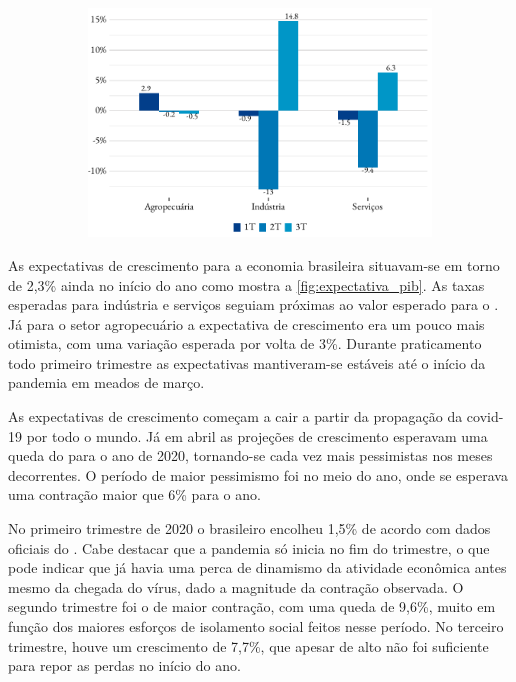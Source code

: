 \begin{figure}[!h]
\begin{subfigure}{\linewidth}
		\includegraphics{fig/pib_oferta.pdf}
		\notes{\trimestres[1-3]}
	\end{subfigure}
\end{figure}
\par As expectativas de crescimento para a economia brasileira situavam-se em torno de 2,3\% ainda no início do ano como mostra a \ref{fig:expectativa_pib}. As taxas esperadas para indústria e serviços seguiam próximas ao valor esperado para o . Já para o setor agropecuário a expectativa de crescimento era um pouco mais otimista, com uma variação esperada por volta de 3\%. Durante praticamento todo primeiro trimestre as expectativas mantiveram-se estáveis até o início da pandemia em meados de março.
\par As expectativas de crescimento começam a cair a partir da propagação da covid-19 por todo o mundo. Já em abril as projeções de crescimento esperavam uma queda do  para o ano de 2020, tornando-se cada vez mais pessimistas nos meses decorrentes. O período de maior pessimismo foi no meio do ano, onde se esperava uma contração maior que 6\% para o ano.
\par No primeiro trimestre de 2020 o  brasileiro encolheu 1,5\% de acordo com dados oficiais do . Cabe destacar que a pandemia só inicia no fim do trimestre, o que pode indicar que já havia uma perca de dinamismo da atividade econômica antes mesmo da chegada do vírus, dado a magnitude da contração observada. O segundo trimestre foi o de maior contração, com uma queda de 9,6\%, muito em função dos maiores esforços de isolamento social feitos nesse período. No terceiro trimestre, houve um crescimento de 7,7\%, que apesar de alto não foi suficiente para repor as perdas no início do ano.
